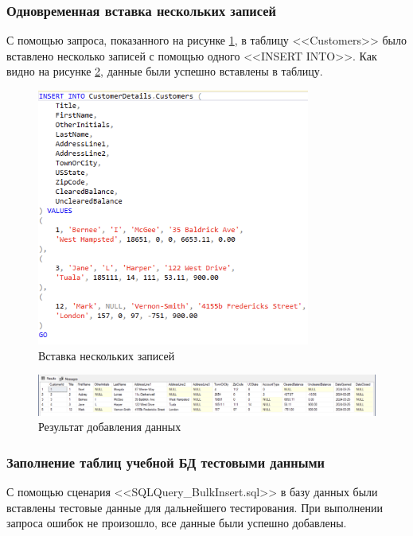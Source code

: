\documentclass[a4paper, 14pt]{extarticle}
\begin{document}
\subsubsection{Одновременная вставка нескольких записей}

С помощью запроса, показанного на рисунке \ref{fig:task-1-20}, в таблицу
<<\foreignlanguage{english}{Customers}>> было вставлено несколько записей с
помощью одного <<\foreignlanguage{english}{INSERT INTO}>>. Как видно на рисунке
\ref{fig:task-1-21}, данные были успешно вставлены в таблицу.

\begin{figure}[H]
  \centering
  \includegraphics[width=0.8\textwidth]{images/task-1/20.png}
  \caption{Вставка нескольких записей}
  \label{fig:task-1-20}
\end{figure}

\begin{figure}[H]
  \centering
  \includegraphics[width=\textwidth]{images/task-1/21.png}
  \caption{Результат добавления данных}
  \label{fig:task-1-21}
\end{figure}

\subsubsection{Заполнение таблиц учебной БД тестовыми данными}

С помощью сценария <<\foreignlanguage{english}{SQLQuery\_BulkInsert.sql}>> в
базу данных были вставлены тестовые данные для дальнейшего тестирования. При
выполнении запроса ошибок не произошло, все данные были успешно добавлены.
\end{document}
